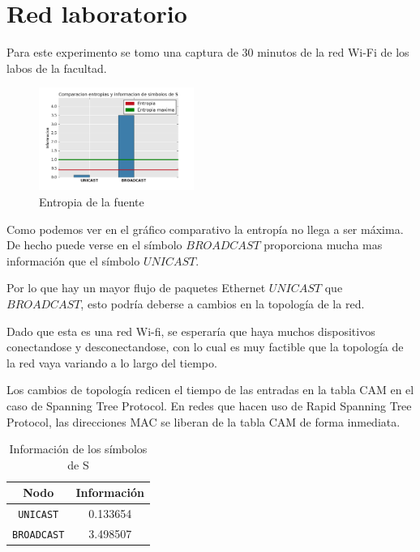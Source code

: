 \section{Red laboratorio}

Para este experimento se tomo una captura de 30 minutos de la red Wi-Fi de los labos de la facultad.

\begin{figure}[h]
  \centering
    \includegraphics[width=0.45\textwidth]{grafico1-red-labos.png}
  \caption{Entropia de la fuente}
  \label{entropia-s}
\end{figure}

Como podemos ver en el gráfico comparativo la entropía no llega a ser máxima. De hecho puede verse en el símbolo $BROADCAST$ proporciona mucha mas información que el símbolo $UNICAST$. 

Por lo que hay un mayor flujo de paquetes Ethernet $UNICAST$ que $BROADCAST$, esto podría deberse a cambios en la topología de la red.

Dado que esta es una red Wi-fi, se esperaría que haya muchos dispositivos conectandose y desconectandose, con lo cual es muy factible que la topología de la red vaya variando a lo largo del tiempo.

Los cambios de topología redicen el tiempo de las entradas en la tabla CAM en el caso de Spanning Tree Protocol. En redes que hacen uso de Rapid Spanning Tree Protocol, las direcciones MAC se liberan de la tabla CAM de forma inmediata.


    \begin{table}[ht]\begin{center}
      \begin{tabular}{|c|c|}
      \hline
      \textbf{Nodo} & \textbf{Información} \\ \hline
      \texttt{UNICAST}& 0.133654 \\ \hline
      \texttt{BROADCAST}& 3.498507 \\ \hline
      \end{tabular}
      \caption{Información de los símbolos de S}
      \label{info-simbolos}
    \end{center}\end{table}


